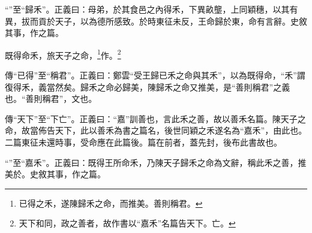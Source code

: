 {\noindent\shu{}\fzkt “”至“歸禾”。正義曰：母弟，於其食邑之內得禾，下異畝壟，上同穎穗，以其有異，拔而貢於天子，以為德所感致。於時東征未反，王命歸於東，命有言辭。史敘其事，作之篇。 \par}

既得命禾，旅天子之命，\footnote{已得之禾，遂陳歸禾之命，而推美。善則稱君。}作。\footnote{天下和同，政之善者，故作書以“嘉禾”名篇告天下。亡。}

{\noindent\zhuan{}\fzbyks 傳“已得”至“稱君”。正義曰：鄭雲“受王歸已禾之命與其禾”，以為既得命，“禾”謂復得禾，義當然矣。歸禾之命必歸美，陳歸禾之命又推美，是“善則稱君”之義也。“善則稱君”，文也。 \par}

{\noindent\zhuan{}\fzbyks 傳“天下”至“下亡”。正義曰：“嘉”訓善也，言此禾之善，故以善禾名篇。陳天子之命，故當佈告天下，此以善禾為書之篇名，後世同穎之禾遂名為“嘉禾”，由此也。二篇東征未還時事，受命應在此篇後。篇在前者，蓋先封，後布此書故也。 \par}

{\noindent\shu{}\fzkt “”至“嘉禾”。正義曰：既得王所命禾，乃陳天子歸禾之命為文辭，稱此禾之善，推美於。史敘其事，作之篇。 \par}

